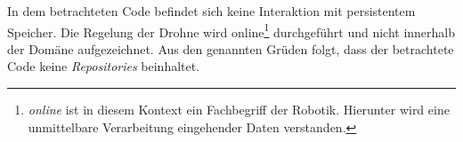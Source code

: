In dem betrachteten Code befindet sich keine Interaktion mit persistentem Speicher. Die Regelung der Drohne wird online\footnote{\textit{online} ist in diesem Kontext ein Fachbegriff der Robotik. Hierunter wird eine unmittelbare Verarbeitung eingehender Daten verstanden.} durchgeführt und nicht innerhalb der Domäne aufgezeichnet.
Aus den genannten Grüden folgt, dass der betrachtete Code keine \textit{Repositories} beinhaltet.